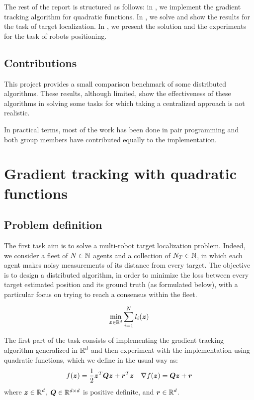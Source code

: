 \documentclass[a4paper,11pt,oneside]{book}
\begin{document}
The rest of the report is structured as follows: in , we implement the gradient tracking algorithm for quadratic functions. In , we solve and show the results for the task of target localization. In , we present the solution and the experiments for the task of robots positioning.


\section*{Contributions}

This project provides a small comparison benchmark of some distributed algorithms. These results, although limited, show the effectiveness of these algorithms in solving some tasks for which taking a centralized approach is not realistic. 

In practical terms, most of the work has been done in pair programming and both group members have contributed equally to the implementation.





\setcounter{page}{1}
\chapter{Gradient tracking with quadratic functions} \label{ch:quadratic}


\section{Problem definition}

The first task aim is to solve a multi-robot target localization problem. Indeed, we consider a fleet of $N \in {\mathbb{N}}$ agents and a collection of $N_T \in {\mathbb{N}}$, in which each agent makes noisy measurements of its distance from every target. The objective is to design a distributed algorithm, in order to minimize the loss between every target estimated position and its ground truth (as formulated below), with a particular focus on trying to reach a consensus within the fleet.

\[
      \min_{{\bm{z}} \in {\mathbb{R}}^{d}} \sum_{i=1}^{N} l_i({\bm{z}})
\]


The first part of the task consists of implementing the gradient tracking algorithm generalized in ${\mathbb{R}}^d$ and then experiment with the implementation using quadratic functions, which we define in the usual way as:
\[
      f({\bm{z}}) = \frac{1}{2} {\bm{z}}^T {\bm{Q}} {\bm{z}} + {\bm{r}}^T {\bm{z}}
      \quad
      \nabla f({\bm{z}}) = {\bm{Q}} {\bm{z}} + {\bm{r}}
\]
where ${\bm{z}} \in {\mathbb{R}}^{d}$, ${\bm{Q}} \in {\mathbb{R}}^{d \times d}$ is positive definite, and ${\bm{r}} \in {\mathbb{R}}^{d}$.
\end{document}
